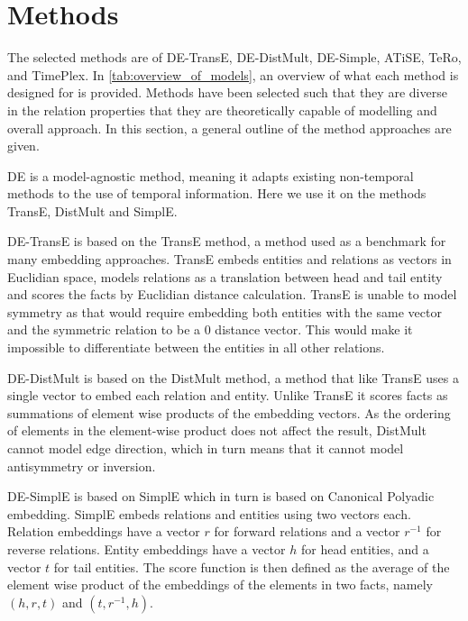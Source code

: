 \section{Methods}
\label{sec:methods}

The selected methods are of DE-TransE, DE-DistMult, DE-Simple, ATiSE, TeRo, and TimePlex. 
In \autoref{tab:overview_of_models}, an overview of what each method is designed for is provided. Methods have been selected such that they are diverse in the relation properties that they are theoretically capable of modelling and overall approach.
In this section, a general outline of the method approaches are given. 


DE is a model-agnostic method, meaning it adapts existing non-temporal methods to the use of temporal information. Here we use it on the methods TransE, DistMult and SimplE.

DE-TransE is based on the TransE \cite{bordes2013transe} method, a method used as a benchmark for many embedding approaches. 
TransE embeds entities and relations as vectors in Euclidian space, 
models relations as a translation between head and tail entity and scores the facts by Euclidian distance calculation.
TransE is unable to model symmetry as that would require embedding both entities with the same vector and the symmetric relation to be a 0 distance vector. This would make it impossible to differentiate between the entities in all other relations.

DE-DistMult is based on the DistMult \cite{yang2015distmult} method, a method that like TransE uses a single vector to embed each relation and entity. Unlike TransE it scores facts as summations of element wise products of the embedding vectors.
As the ordering of elements in the element-wise product does not affect the result, DistMult cannot model edge direction, which in turn means that it cannot model antisymmetry or inversion.

DE-SimplE is based on SimplE \cite{kazemi2018simple} which in turn is based on Canonical Polyadic \cite{hitchcock1927cp} embedding. 
SimplE embeds relations and entities using two vectors each. Relation embeddings have a vector $r$ for forward relations and a vector $r^{-1}$ for reverse relations. Entity embeddings have a vector $h$ for head entities, and a vector $t$ for tail entities.
The score function is then defined as the average of the element wise product of the embeddings of the elements in two facts, namely $(h, r, t)$ and $(t, r^{-1}, h)$.

